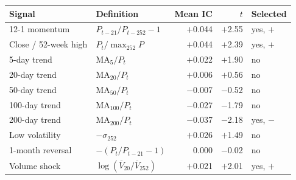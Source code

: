 \begin{tabular}{@{}llrrl@{}}
\toprule
Signal & Definition & Mean IC & $t$ & Selected \\
\midrule
12-1 momentum & $P_{t-21}/P_{t-252} - 1$ & $+$0.044 & $+$2.55 & yes, $+$ \\
Close / 52-week high & $P_t / \max_{252} P$ & $+$0.044 & $+$2.39 & yes, $+$ \\
5-day trend & $\mathrm{MA}_5/P_t$ & $+$0.022 & $+$1.90 & no \\
20-day trend & $\mathrm{MA}_{20}/P_t$ & $+$0.006 & $+$0.56 & no \\
50-day trend & $\mathrm{MA}_{50}/P_t$ & $-$0.007 & $-$0.52 & no \\
100-day trend & $\mathrm{MA}_{100}/P_t$ & $-$0.027 & $-$1.79 & no \\
200-day trend & $\mathrm{MA}_{200}/P_t$ & $-$0.037 & $-$2.18 & yes, $-$ \\
Low volatility & $-\sigma_{252}$ & $+$0.026 & $+$1.49 & no \\
1-month reversal & $-(P_t/P_{t-21} - 1)$ & 0.000 & $-$0.02 & no \\
Volume shock & $\log(\overline{V}_{20}/\overline{V}_{252})$ & $+$0.021 & $+$2.01 & yes, $+$ \\
\bottomrule
\end{tabular}
